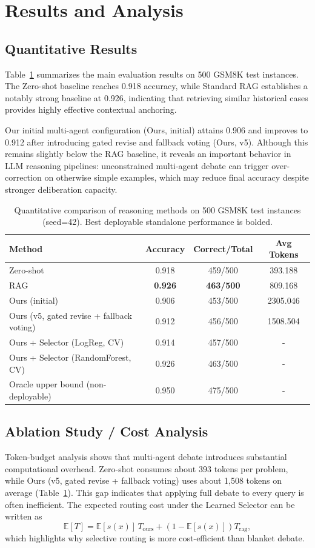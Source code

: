 \section{Results and Analysis}

\subsection{Quantitative Results}
Table~\ref{tab:main_results_500} summarizes the main evaluation results on 500 GSM8K test instances. The Zero-shot baseline reaches 0.918 accuracy, while Standard RAG establishes a notably strong baseline at 0.926, indicating that retrieving similar historical cases provides highly effective contextual anchoring.

Our initial multi-agent configuration (Ours, initial) attains 0.906 and improves to 0.912 after introducing gated revise and fallback voting (Ours, v5). Although this remains slightly below the RAG baseline, it reveals an important behavior in LLM reasoning pipelines: unconstrained multi-agent debate can trigger over-correction on otherwise simple examples, which may reduce final accuracy despite stronger deliberation capacity.

\begin{table}[H]
\caption{Quantitative comparison of reasoning methods on 500 GSM8K test instances (seed=42). Best deployable standalone performance is bolded.}
\label{tab:main_results_500}
\centering
\small
\begin{tabular}{lccc}
\toprule
Method & Accuracy & Correct/Total & Avg Tokens \\
\midrule
Zero-shot & 0.918 & 459/500 & 393.188 \\
RAG & \textbf{0.926} & \textbf{463/500} & 809.168 \\
Ours (initial) & 0.906 & 453/500 & 2305.046 \\
Ours (v5, gated revise + fallback voting) & 0.912 & 456/500 & 1508.504 \\
Ours + Selector (LogReg, CV) & 0.914 & 457/500 & - \\
Ours + Selector (RandomForest, CV) & 0.926 & 463/500 & - \\
Oracle upper bound (non-deployable) & 0.950 & 475/500 & - \\
\bottomrule
\end{tabular}
\end{table}

\subsection{Ablation Study / Cost Analysis}
Token-budget analysis shows that multi-agent debate introduces substantial computational overhead. Zero-shot consumes about 393 tokens per problem, while Ours (v5, gated revise + fallback voting) uses about 1,508 tokens on average (Table~\ref{tab:main_results_500}). This gap indicates that applying full debate to every query is often inefficient.
The expected routing cost under the Learned Selector can be written as
\[
\mathbb{E}[T]=\mathbb{E}[s(x)]\,T_{\text{ours}}+\left(1-\mathbb{E}[s(x)]\right)T_{\text{rag}},
\]
which highlights why selective routing is more cost-efficient than blanket debate.

